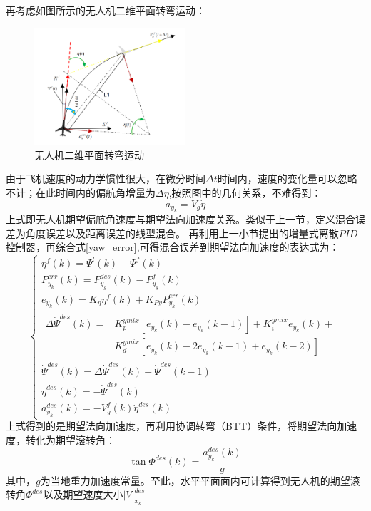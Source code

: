 再考虑如图所示的无人机二维平面转弯运动：
\begin{figure}[H]
    \centering
    \includegraphics[width=0.5\textwidth]{figures/c3/c3-BTT.png}
    \caption{无人机二维平面转弯运动}\label{fig:c3-BTT}
\end{figure}
由于飞机速度的动力学惯性很大，在微分时间$\Delta t$时间内，速度的变化量可以忽略不计；在此时间内的偏航角增量为$\Delta\eta$,按照图中的几何关系，不难得到：
\begin{equation}
    a_{y_k}=V_g\dot{\eta}
    \label{btt_dot}
\end{equation}
上式即无人机期望偏航角速度与期望法向加速度关系。类似于上一节，定义混合误差为角度误差以及距离误差的线型混合。
再利用上一小节提出的增量式离散$PID$控制器，再综合式\ref{yaw_error},可得混合误差到期望法向加速度的表达式为：
\begin{equation}
    \left\{
        \begin{array}{l}
            \eta^f(k)=\Psi^l(k)-\Psi^f(k)\\
            P_{y_k}^{err}(k)=P_{y_g}^{des}(k)-P_{y_g}^{f}(k)\\
            e_{y_k}(k)=K_{\eta}\eta^f(k)+K_{Py}P_{y_k}^{err}(k)\\
                \begin{aligned}
                \Delta\dot{\Psi}^{des}(k)=&K_{p}^{ymix}[e_{y_k}(k)-e_{y_k}(k-1)]+K_{i}^{ymix}e_{y_k}(k)+\\
                &K_{d}^{ymix}[e_{y_k}(k)-2e_{y_k}(k-1)+e_{y_k}(k-2)]
                \end{aligned}\\
            \dot{\Psi}^{des}(k)=\Delta\dot{\Psi}^{des}(k)+\dot{\Psi}^{des}(k-1)\\
            \dot{\eta}^{des}(k)=-\dot{\Psi}^{des}(k)\\
            a_{y_k}^{des}(k)=-V_g^{f}(k)\dot{\eta}^{des}(k)
    \end{array}
\right .
    \label{angle_controller}
\end{equation}
上式得到的是期望法向加速度，再利用协调转弯（BTT）条件，将期望法向加速度，转化为期望滚转角：
\begin{equation}
    \tan\Phi^{des}(k)=\frac{a_{y_k}^{des}(k)}{g}
    \label{btt_a2roll}
\end{equation}
其中，$g$为当地重力加速度常量。至此，水平平面面内可计算得到无人机的期望滚转角$\Phi^{des}$以及期望速度大小$|V|_{x_k}^{des}$
